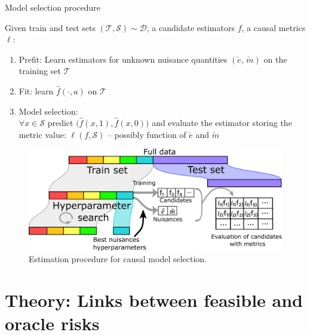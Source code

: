 \documentclass[french,12pt,twoside,a4paper]{book}
\begin{document}
\begin{algorithm}[!h]
  \caption{Model selection procedure}\label{problem:estimation_procedure:algo} {%
    Given train and test sets $(\mathcal{T}, \mathcal{S}) \sim \mathcal{D}$,
    a candidate estimators $f$, a causal
    metrics $\ell$:
    \begin{enumerate}
      \item Prefit: Learn estimators for unknown nuisance quantities $(\check e,\,\check m)$ on the training set $\mathcal{T}$
      \item Fit: learn $\hat f(\cdot, a)$ on
            $\mathcal T$
      \item Model selection: \\
            $\forall{x} \in \mathcal{S}$ predict
            $\big(\hat f(x, 1), \hat f(x, 0)\big)$ and evaluate the estimator storing the metric value: $\ell(f, \mathcal S)$ -- possibly
            function of $\check e$ and $\check m$
    \end{enumerate}

  }
\end{algorithm}
\begin{figure}[!h]
  \includegraphics[width=0.9\linewidth]{img/chapter_5/estimation_procedure_causal_selection_procedure.png}
  \caption{Estimation procedure for causal model
    selection.}\label{problem:estimation_procedure:figure}
\end{figure}

\section{Theory: Links between feasible and oracle risks}\label{sec:theory}
\end{document}

